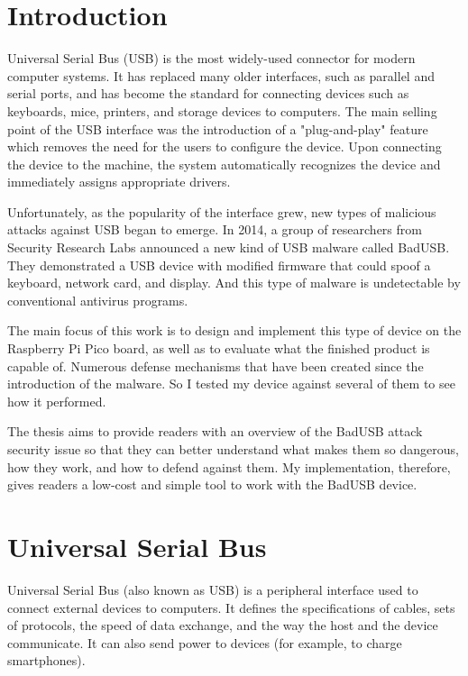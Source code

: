 \chapter{Introduction}
Universal Serial Bus (USB) is the most widely-used connector for modern computer systems. It has replaced many older interfaces, such as parallel and serial ports, and has become the standard for connecting devices such as keyboards, mice, printers, and storage devices to computers. The main selling point of the USB interface was the introduction of a "plug-and-play" feature which removes the need for the users to configure the device. Upon connecting the device to the machine, the system automatically recognizes the device and immediately assigns appropriate drivers.

Unfortunately, as the popularity of the interface grew, new types of malicious attacks against USB began to emerge. In 2014, a group of researchers from Security Research Labs announced a new kind of USB malware called BadUSB. They demonstrated a USB device with modified firmware that could spoof a keyboard, network card, and display. And this type of malware is undetectable by conventional antivirus programs.

The main focus of this work is to design and implement this type of device on the Raspberry Pi Pico board, as well as to evaluate what the finished product is capable of. Numerous defense mechanisms that have been created since the introduction of the malware. So I tested my device against several of them to see how it performed.

The thesis aims to provide readers with an overview of the BadUSB attack security issue so that they can better understand what makes them so dangerous, how they work, and how to defend against them. My implementation, therefore, gives readers a low-cost and simple tool to work with the BadUSB device.


\chapter{Universal Serial Bus}
\label{ch:usb}
Universal Serial Bus (also known as USB) is a peripheral interface used to connect external devices to computers. It defines the specifications of cables, sets of protocols, the speed of data exchange, and the way the host and the device communicate. It can also send power to devices (for example, to charge smartphones).


